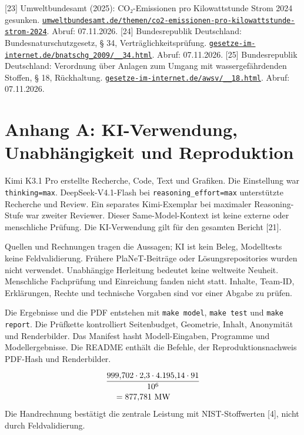 \begin{description}[leftmargin=8mm,labelsep=2mm]
\newpage
{} [23] Umweltbundesamt (2025): CO₂-Emissionen pro Kilowattstunde Strom 2024 gesunken. \href{https://www.umweltbundesamt.de/themen/co2-emissionen-pro-kilowattstunde-strom-2024}{\nolinkurl{umweltbundesamt.de/themen/co2-emissionen-pro-kilowattstunde-strom-2024}}. Abruf: 07.11.2026.
 [24] Bundesrepublik Deutschland: Bundesnaturschutzgesetz, § 34, Verträglichkeitsprüfung. \href{https://www.gesetze-im-internet.de/bnatschg_2009/__34.html}{\nolinkurl{gesetze-im-internet.de/bnatschg_2009/__34.html}}. Abruf: 07.11.2026.
 [25] Bundesrepublik Deutschland: Verordnung über Anlagen zum Umgang mit wassergefährdenden Stoffen, § 18, Rückhaltung. \href{https://www.gesetze-im-internet.de/awsv/__18.html}{\nolinkurl{gesetze-im-internet.de/awsv/__18.html}}. Abruf: 07.11.2026.
\end{description}

\raggedbottom
\clearpage
\section*{Anhang A: KI-Verwendung, Unabhängigkeit und Reproduktion}
\begingroup
\setlength{\emergencystretch}{3em}
\setlength{\parskip}{3pt}
\setlength{\parindent}{1.25em}

Kimi K3.1 Pro erstellte Recherche, Code, Text und Grafiken. Die Einstellung war \texttt{thinking=max}. DeepSeek-V4.1-Flash bei \texttt{reasoning\_effort=max} unterstützte Recherche und Review. Ein separates Kimi-Exemplar bei maximaler Reasoning-Stufe war zweiter Reviewer. Dieser Same-Model-Kontext ist keine externe oder menschliche Prüfung. Die KI-Verwendung gilt für den gesamten Bericht [21].

Quellen und Rechnungen tragen die Aussagen; KI ist kein Beleg, Modelltests keine Feldvalidierung. Frühere PlaNeT-Beiträge oder Lösungsrepositories wurden nicht verwendet. Unabhängige Herleitung bedeutet keine weltweite Neuheit. Menschliche Fachprüfung und Einreichung fanden nicht statt. Inhalte, Team-ID, Erklärungen, Rechte und technische Vorgaben sind vor einer Abgabe zu prüfen.

Die Ergebnisse und die PDF entstehen mit \mbox{\texttt{make model}}, \mbox{\texttt{make test}} und \mbox{\texttt{make report}}. Die Prüfkette kontrolliert Seitenbudget, Geometrie, Inhalt, Anonymität und Renderbilder. Das Manifest hasht Modell-Eingaben, Programme und Modellergebnisse. Die README enthält die Befehle, der Reproduktionsnachweis PDF-Hash und Renderbilder.

\[
\begin{aligned}
&\frac{999{,}702\cdot2{,}3\cdot4.195{,}14\cdot91}{10^6}\\
&\quad=877{,}781~\mathrm{MW}
\end{aligned}
\]
Die Handrechnung bestätigt die zentrale Leistung mit NIST-Stoffwerten [4], nicht durch Feldvalidierung.

